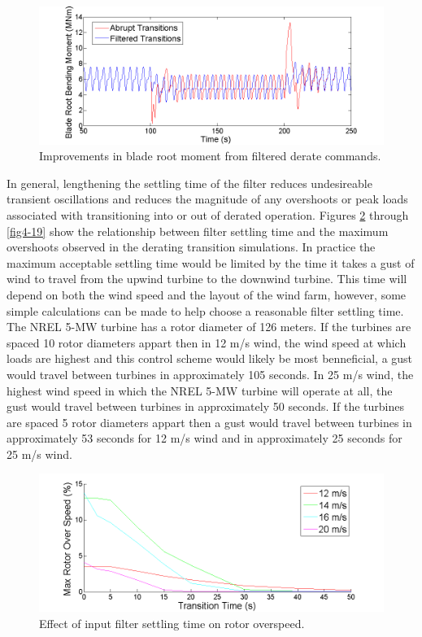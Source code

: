 \begin{figure}[htbp]
	\centering
		\includegraphics[trim = {1cm 0 2cm 0}, clip, width = \linewidth]{Figures/ch4Figures/fig4-16.png}
		
	\caption{Improvements in blade root moment from filtered derate commands.}
	\label{fig4-16}
\end{figure}


In general, lengthening the settling time of the filter reduces undesireable transient oscillations and reduces the magnitude of any overshoots or peak loads associated with transitioning into or out of derated operation. Figures \ref{fig4-17} through \ref{fig4-19} show the relationship between filter settling time and the maximum overshoots observed in the derating transition simulations. In practice the maximum acceptable settling time would be limited by the time it takes a gust of wind to travel from the upwind turbine to the downwind turbine. This time will depend on both the wind speed and the layout of the wind farm, however, some simple calculations can be made to help choose a reasonable filter settling time. The NREL 5-MW turbine has a rotor diameter of 126 meters. If the turbines are spaced 10 rotor diameters appart then in 12 m/s wind, the wind speed at which loads are highest and this control scheme would likely be most benneficial, a gust would travel between turbines in approximately 105 seconds. In 25 m/s wind, the highest wind speed in which the NREL 5-MW turbine will operate at all, the gust would travel between turbines in approximately 50 seconds. If the turbines are spaced 5 rotor diameters appart then a gust would travel between turbines in approximately 53 seconds for 12 m/s wind and in approximately 25 seconds for 25 m/s wind. 


\begin{figure}[htbp]
	\centering
		\includegraphics[trim = {1cm 0 2cm 0}, clip, width = \linewidth]{Figures/ch4Figures/fig4-17.png}
		
	\caption{Effect of input filter settling time on rotor overspeed.}
	\label{fig4-17}
\end{figure}

